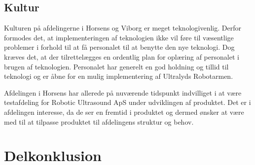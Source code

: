 \subsection{Kultur}
Kulturen på afdelingerne i Horsens og Viborg er meget teknologivenlig. Derfor formodes det, at implementeringen af teknologien ikke vil føre til væsentlige problemer i forhold til at få personalet til at benytte den nye teknologi. Dog kræves det, at der tilrettelægges en ordentlig plan for oplæring af personalet i brugen af teknologien. Personalet har generelt en god holdning og tillid til teknologi og er åbne for en mulig implementering af Ultralyds Robotarmen.

Afdelingen i Horsens har allerede på nuværende tidspunkt indvilliget i at være testafdeling for Robotic Ultrasound ApS under udviklingen af produktet. Det er i afdelingen interesse, da de ser en fremtid i produktet og dermed ønsker at være med til at tilpasse produktet til afdelingens struktur og behov.   

\section{Delkonklusion}

